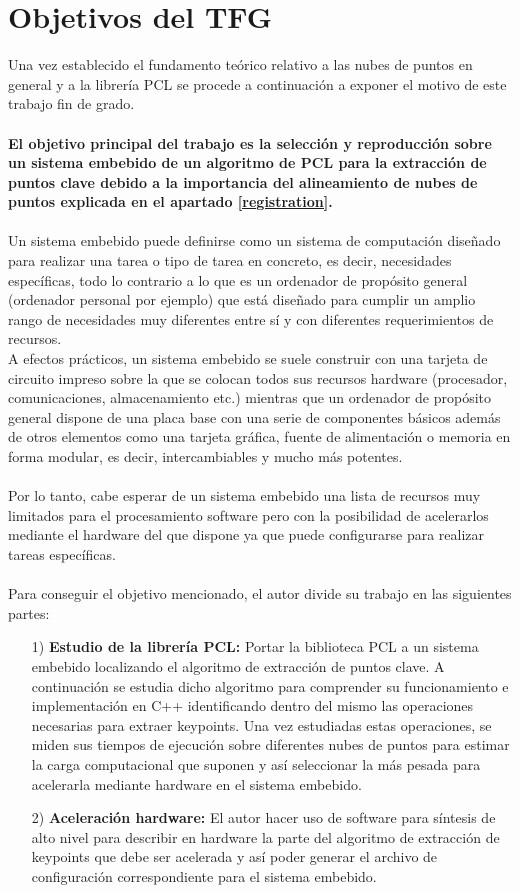 \section{Objetivos del TFG}
Una vez establecido el fundamento teórico relativo a las nubes de puntos en general y a la librería PCL se procede a continuación a exponer el motivo de este trabajo fin de grado.
\\
\\
\textbf{El objetivo principal del trabajo es la selección y reproducción sobre un sistema embebido de un algoritmo de PCL para la extracción de puntos clave debido a la importancia del alineamiento de nubes de puntos explicada en el apartado \ref{registration}.} 
\\
\\
Un sistema embebido puede definirse como un sistema de computación diseñado para realizar una tarea o tipo de tarea en concreto, es decir, necesidades específicas, todo lo contrario a lo que es un ordenador de propósito general (ordenador personal por ejemplo) que está diseñado para cumplir un amplio rango de necesidades muy diferentes entre sí y con diferentes requerimientos de recursos.
\\
A efectos prácticos, un sistema embebido se suele construir con una tarjeta de circuito impreso sobre la que se colocan todos sus recursos hardware (procesador, comunicaciones, almacenamiento etc.) mientras que un ordenador de propósito general dispone de una placa base con una serie de componentes básicos además de otros elementos como una tarjeta gráfica, fuente de alimentación o memoria en forma modular, es decir, intercambiables y mucho más potentes.
\\
\\
Por lo tanto, cabe esperar de un sistema embebido una lista de recursos muy limitados para el procesamiento software pero con la posibilidad de acelerarlos mediante el hardware del que dispone ya que puede configurarse para realizar tareas específicas.
\\
\\
Para conseguir el objetivo mencionado, el autor divide su trabajo en las siguientes partes:
\begin{itemize}
\item[1)] \textbf{Estudio de la librería PCL:} Portar la biblioteca PCL a un sistema embebido localizando el algoritmo de extracción de puntos clave. A continuación se estudia dicho algoritmo para comprender su funcionamiento e implementación en C++ identificando dentro del mismo las operaciones necesarias para extraer keypoints. Una vez estudiadas estas operaciones, se miden sus tiempos de ejecución sobre diferentes nubes de puntos para estimar la carga computacional que suponen y así seleccionar la más pesada para acelerarla mediante hardware en el sistema embebido.

\item[2)] \textbf{Aceleración hardware:} El autor hacer uso de software para síntesis de alto nivel para describir en hardware la parte del algoritmo de extracción de keypoints que debe ser acelerada y así poder generar el archivo de configuración correspondiente para el sistema embebido.
\end{itemize}

